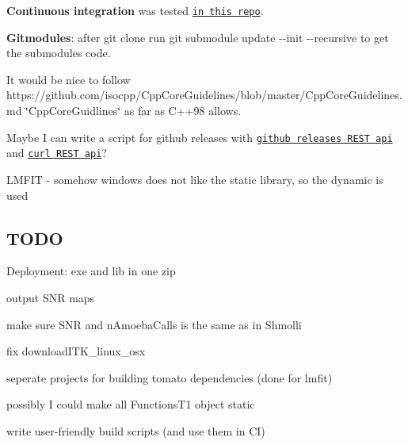 \begin{DoxyItemize}
\item {\bfseries Continuous integration} was tested \href{https://github.com/MRKonrad/ContinousIntegrationPlayground}{\tt in this repo}.
\item {\bfseries Gitmodules}\-: after {\ttfamily git clone} run {\ttfamily git submodule update -\/-\/init -\/-\/recursive} to get the submodules code.
\item It would be nice to follow https\-://github.com/isocpp/\-Cpp\-Core\-Guidelines/blob/master/\-Cpp\-Core\-Guidelines.\-md \char`\"{}\-Cpp\-Core\-Guidlines\char`\"{} as far as C++98 allows.
\item Maybe I can write a script for github releases with \href{https://developer.github.com/v3/repos/releases/#create-a-release}{\tt github releases R\-E\-S\-T api} and \href{http://www.codingpedia.org/ama/how-to-test-a-rest-api-from-command-line-with-curl/#12_HEAD_requests}{\tt curl R\-E\-S\-T api}?
\item L\-M\-F\-I\-T -\/ somehow windows does not like the static library, so the dynamic is used
\end{DoxyItemize}

\subsection*{T\-O\-D\-O}


\begin{DoxyItemize}
\item Deployment\-: exe and lib in one zip
\item output S\-N\-R maps
\item make sure S\-N\-R and n\-Amoeba\-Calls is the same as in Shmolli
\item fix download\-I\-T\-K\-\_\-linux\-\_\-osx
\item seperate projects for building tomato dependencies (done for lmfit)
\item possibly I could make all Functions\-T1 object static
\item write user-\/friendly build scripts (and use them in C\-I) 
\end{DoxyItemize}